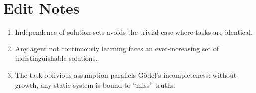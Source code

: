\documentclass{article}
\begin{document}
\section*{Edit Notes}
\begin{enumerate}
  \item Independence of solution sets avoids the trivial case where tasks are identical.
  \item Any agent not continuously learning faces an ever-increasing set of indistinguishable solutions.
  \item The task-oblivious assumption parallels Gödel’s incompleteness: without growth, any static system is bound to “miss” truths.
\end{enumerate}
\end{document}
